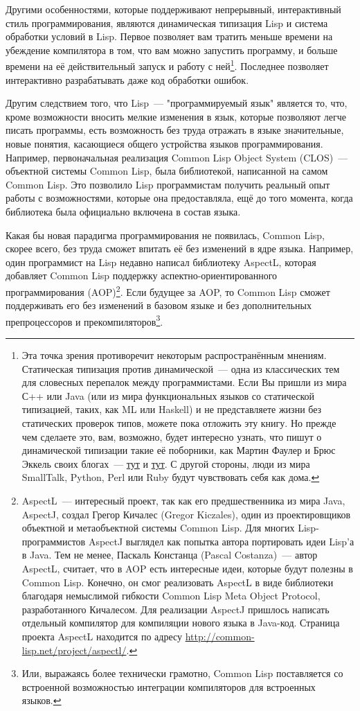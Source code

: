Другими особенностями, которые поддерживают непрерывный, интерактивный стиль
программирования, являются динамическая типизация Lisp и система обработки условий в
Lisp. Первое позволяет вам тратить меньше времени на убеждение компилятора в том, что вам
можно запустить программу, и больше времени на её действительный запуск и работу с
ней\footnote{Эта точка зрения противоречит некоторым распространённым мнениям. Статическая
  типизация против динамической~--- одна из классических тем для словесных перепалок между
  программистами. Если Вы пришли из мира С++ или Java (или из мира функциональных языков
  со статической типизацией, таких, как ML или Haskell) и не представляете жизни без
  статических проверок типов, можете пока отложить эту книгу. Но прежде чем сделаете это,
  вам, возможно, будет интересно узнать, что пишут о динамической типизации такие её
  поборники, как Мартин Фаулер и Брюс Эккель своих блогах~---
  \href{http://www.artima.com/weblogs/viewpost.jsp?thread=4639}{тут} и
  \href{http://www.mindview.net/WebLog/log-0025}{тут}. С другой стороны, люди из мира
  SmallTalk, Python, Perl или Ruby будут чувствовать себя как дома.}. Последнее позволяет
интерактивно разрабатывать даже код обработки ошибок.

Другим следствием того, что Lisp~--- "программируемый язык" является то, что, кроме
возможности вносить мелкие изменения в язык, которые позволяют легче писать программы,
есть возможность без труда отражать в языке значительные, новые понятия, касающиеся общего
устройства языков программирования. Например, первоначальная реализация Common Lisp Object
System (CLOS)~--- объектной системы Common Lisp, была библиотекой, написанной на самом
Common Lisp. Это позволило Lisp программистам получить реальный опыт работы с
возможностями, которые она предоставляла, ещё до того момента, когда библиотека была
официально включена в состав языка.

Какая бы новая парадигма программирования не появилась, Common Lisp, скорее всего, без
труда сможет впитать её без изменений в ядре языка. Например, один программист на Lisp
недавно написал библиотеку AspectL, которая добавляет Common Lisp поддержку
аспектно-ориентированного программирования (AOP)\footnote{AspectL~--- интересный проект,
  так как его предшественника из мира Java, AspectJ, создал Грегор Кичалес (Gregor
  Kiczales), один из проектировщиков объектной и метаобъектной системы Common Lisp. Для
  многих Lisp-программистов AspectJ выглядел как попытка автора портировать идеи Lisp'а в
  Java. Тем не менее, Паскаль Констанца (Pascal Costanza)~--- автор AspectL, считает, что
  в AOP есть интересные идеи, которые будут полезны в Common Lisp. Конечно, он смог
  реализовать AspectL в виде библиотеки благодаря немыслимой гибкости Common Lisp Meta
  Object Protocol, разработанного Кичалесом. Для реализации AspectJ пришлось написать
  отдельный компилятор для компиляции нового языка в Java-код. Страница проекта AspectL
  находится по адресу \url{http://common-lisp.net/project/aspectl/}.}. Если будущее за
AOP, то Common Lisp сможет поддерживать его без изменений в базовом языке и без
дополнительных препроцессоров и прекомпиляторов\footnote{Или, выражаясь более технически
  грамотно, Common Lisp поставляется со встроенной возможностью интеграции компиляторов
  для встроенных языков.}.


